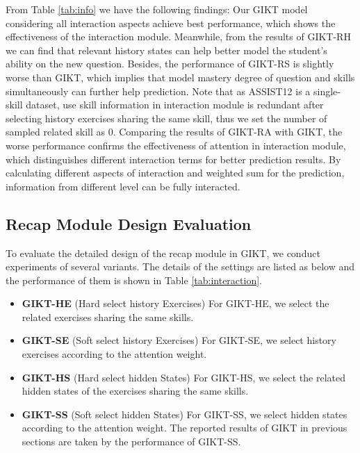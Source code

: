 \documentclass[runningheads]{llncs}
\begin{document}
From Table \ref{tab:info} we have the following findings: Our GIKT model considering all interaction aspects achieve best performance, which shows the effectiveness of the interaction module. Meanwhile, from the results of GIKT-RH we can find that relevant history states can help better model the student's ability on the new question. Besides, the performance of GIKT-RS is slightly worse than GIKT, which implies that model mastery degree of question and skills simultaneously can further help prediction. Note that as ASSIST12 is a single-skill dataset, use skill information in interaction module is redundant after selecting history exercises sharing the same skill, thus we set the number of sampled related skill as 0. Comparing the results of GIKT-RA with GIKT, the worse performance confirms the effectiveness of attention in interaction module, which distinguishes different interaction terms for better prediction results. By calculating different aspects of interaction and weighted sum for the prediction, information from different level can be fully interacted. 











\subsection{Recap Module Design Evaluation}
\label{sec:recap-design}



To evaluate the detailed design of the recap module in GIKT, we conduct experiments of several variants. The details of the settings are listed as below and the performance of them is shown in Table \ref{tab:interaction}.
\begin{itemize}
	




	\item \textbf{GIKT-HE} (Hard select history Exercises) For GIKT-HE, we select the related exercises sharing the same skills.
	
	\item \textbf{GIKT-SE} (Soft select history Exercises) For GIKT-SE, we select history exercises according to the attention weight.
	
	\item \textbf{GIKT-HS} (Hard select hidden States) For GIKT-HS, we select the related hidden states of the exercises sharing the same skills.
	
	\item \textbf{GIKT-SS} (Soft select hidden States) For GIKT-SS, we select hidden states according to the attention weight. The reported results of GIKT in previous sections are taken by the performance of GIKT-SS.
	
\end{itemize}
\end{document}
